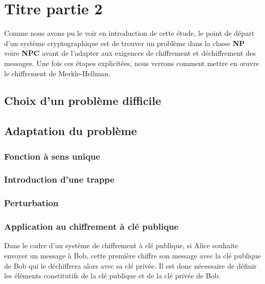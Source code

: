 
\newpage

\section[Chiffrement de Merkle-Hellman]{Titre partie 2}

Comme nous avons pu le voir en introduction de cette étude, le point de départ d'un système cryptographique est de trouver un problème dans la classe \textbf{NP} voire \textbf{NPC} avant de l'adapter aux exigences de chiffrement et déchiffrement des messages. Une fois ces étapes explicitées, nous verrons comment mettre en œuvre le chiffrement de Merkle-Hellman.


\subsection{Choix d'un problème difficile}
\label{problem}





\subsection{Adaptation du problème}



\subsubsection{Fonction à sens unique}




\subsubsection{Introduction d'une trappe}
\label{trappe}



\subsubsection{Perturbation}
\label{clés}



\subsubsection{Application au chiffrement à clé publique}

Dans le cadre d'un système de chiffrement à clé publique, si Alice souhaite envoyer un message à Bob, cette première chiffre son message avec la clé publique de Bob qui le déchiffrera alors avec sa clé privée. Il est donc nécessaire de définir les éléments constitutifs de la clé publique et de la clé privée de Bob.

